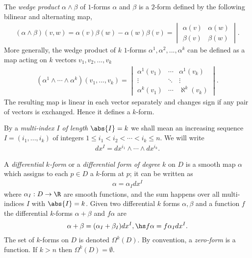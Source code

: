 \documentclass{article}
\begin{document}
\begin{definition}
    The \emph{wedge product} $\alpha \wedge \beta$ of $1$-forms $\alpha$ and $\beta$ is a $2$-form defined
    by the following bilinear and alternating map,
    \begin{align*}
        (\alpha\wedge\beta)(v,w) = \alpha(v)\beta(w) - \alpha(w)\beta(v) = \begin{vmatrix}
            \alpha(v) &\alpha(w) \\
            \beta(v) &\beta(w)
        \end{vmatrix}.
    \end{align*}
    More generally, the wedge product of $k$ $1$-forms $\alpha^1,\alpha^2,...,\alpha^k$ can be defined as a
    map acting on $k$ vectors $v_1,v_2,...,v_k$
    \begin{align*}
        (\alpha^1\wedge\cdots\wedge\alpha^k)(v_1,...,v_k) = \begin{vmatrix}
            \alpha^1(v_1) &\cdots &\alpha^1(v_k)\\
            \vdots &\ddots &\vdots \\ 
            \alpha^k(v_1) &\cdots &\aleph^k(v_k)
        \end{vmatrix}.
    \end{align*}
    The resulting map is linear in each vector separately and changes sign if any pair of vectors is exchanged.
    Hence it defines a $k$-form.
\end{definition}

\begin{definition}
    By a \emph{multi-index $I$ of length $\abs{I}=k$} we shall mean an increasing sequence
    $I=(i_1,...,i_k)$ of integers $1\leq i_1<i_2<\cdots<i_k\leq n$. We will write
    \begin{align*}
        dx^I = dx^{i_1} \wedge \cdots \wedge dx^{i_k}.
    \end{align*}
\end{definition}

\begin{definition}
    A \emph{differential $k$-form} or a \emph{differential form of degree $k$} on $D$ is a
    smooth map $\alpha$ which assigns to each $p\in D$ a $k$-form at $p$; it can be written as
    \begin{align*}
        \alpha=\alpha_Idx^I
    \end{align*}
    where $\alpha_I:D\to\R$ are smooth functions, and the sum happens over all multi-indices
    $I$ with $\abs{I}=k$. Given two differential $k$ forms $\alpha,\beta$ and a function $f$ 
    the differential $k$-forms $\alpha+\beta$ and $f\alpha$ are 
    \begin{align*}
        \alpha + \beta = (\alpha_I + \beta_I)dx^I, \hs f\alpha = f\alpha_I dx^I.
    \end{align*}
    The set of $k$-forms on $D$ is denoted $\Omega^k(D)$. By convention, a \emph{zero-form}
    is a function. If $k>n$ then $\Omega^k(D)=\emptyset$.
\end{definition}
\end{document}
